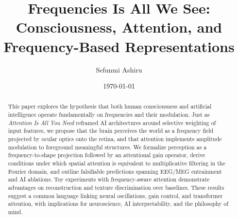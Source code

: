 \documentclass[12pt]{article}
\title{Frequencies Is All We See:\\
Consciousness, Attention, and Frequency-Based Representations}
\author{Sefunmi Ashiru}
\date{\today}
\begin{document}
\maketitle

\begin{abstract}
%
This paper explores the hypothesis that both human consciousness and artificial intelligence operate fundamentally on frequencies and their modulation. Just as \emph{Attention Is All You Need} reframed AI architectures around selective weighting of input features, we propose that the brain perceives the world as a frequency field projected by ocular optics onto the retina, and that attention implements amplitude modulation to foreground meaningful structures. We formalize perception as a frequency-to-shape projection followed by an attentional gain operator, derive conditions under which spatial attention is equivalent to multiplicative filtering in the Fourier domain, and outline falsifiable predictions spanning EEG/MEG entrainment and AI ablations. Toy experiments with frequency-aware attention demonstrate advantages on reconstruction and texture discrimination over baselines. These results suggest a common language linking neural oscillations, gain control, and transformer attention, with implications for neuroscience, AI interpretability, and the philosophy of mind.
\end{abstract}

\newpage
\tableofcontents
\newpage

\end{document}
